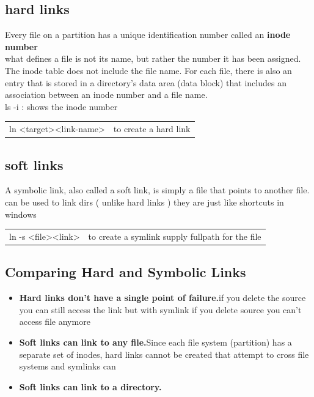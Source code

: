 \documentclass[10pt]{article}
\begin{document}
\subsection{hard links}
Every file on a partition has a unique identification number called an \textbf{inode number}\\
what defines a file is not its name, but rather the number it has been assigned.
The inode table does not include the file name. For each file, there is
also an entry that is stored in a directory's data area (data block) that includes
an association between an inode number and a file name.\\
ls -i : shows the inode number\\
\begin{center}
	\begin{tabular}{l l}

		ln \textless target\textgreater  \textless link-name\textgreater	  &to create a hard link\\
	\end{tabular}
\end{center}
\subsection{soft links}
A symbolic link, also called a soft link, is simply a file that points to another file.
can be used to link dirs ( unlike hard links ) they are just like shortcuts in windows\\
\begin{center}
	\begin{tabular}{l l}
		ln -s \textless file\textgreater  \textless link\textgreater  &to create a symlink supply fullpath for the file

	\end{tabular}
\end{center}
\subsection{Comparing Hard and Symbolic Links}
\begin{itemize}
	\item \textbf{Hard links don’t have a single point of failure.}if you delete the source you can still access the link but with symlink if you delete source you can't access file anymore
	\item   \textbf{Soft links can link to any file.}Since each file system (partition) has a separate set of inodes, hard links cannot be created that attempt to cross file systems and symlinks can
	\item   \textbf{Soft links can link to a directory.}
\end{itemize}
\end{document}
